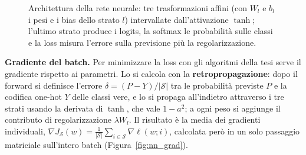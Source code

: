 \documentclass[italian, a4paper, twoside, binding=6mm]{sapthesis}
\begin{document}
\begin{figure}[H]
\centering
{}
\caption{Architettura della rete neurale: tre trasformazioni affini (con
$W_l$ e $b_l$ i pesi e i bias dello strato $l$) intervallate dall'attivazione
$\tanh$; l'ultimo strato produce i logits, la softmax le probabilità sulle
classi e la loss misura l'errore sulla previsione più la regolarizzazione.}
\label{fig:nn_arch}
\end{figure}

\textbf{Gradiente del batch.} Per minimizzare la loss con gli algoritmi della
tesi serve il gradiente rispetto ai parametri. Lo si calcola con la
\textbf{retropropagazione}: dopo il forward si definisce l'errore
$\delta = (P - Y)/|\mathcal{S}|$ tra le probabilità previste $P$ e la codifica
one-hot $Y$ delle classi vere, e lo si propaga all'indietro attraverso i tre
strati usando la derivata di $\tanh$, che vale $1 - a^2$; a ogni peso si
aggiunge il contributo di regolarizzazione $\lambda W_l$. Il risultato è la
media dei gradienti individuali,
$\nabla J_\mathcal{S}(w) = \frac{1}{|\mathcal{S}|}\sum_{i\in\mathcal{S}}\nabla\ell(w;i)$,
calcolata però in un solo passaggio matriciale sull'intero batch
(Figura~\ref{fig:nn_grad}).
\end{document}
